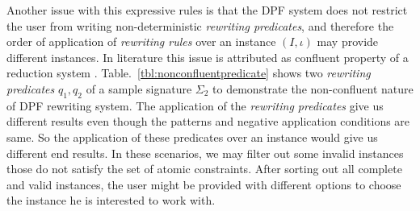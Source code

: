 \documentclass{eceasst}
\begin{document}
Another issue with this expressive rules is that the DPF system does not restrict the user from writing non-deterministic \textit{rewriting predicates}, and therefore  
the order of application of \textit{rewriting rules} over an instance $(I, \iota)$ may provide different instances. 
In literature this issue is attributed as confluent property of a reduction system \cite{BN98}. 
Table.~\ref{tbl:nonconfluentpredicate} shows two \textit{rewriting predicates} $q_1, q_2$ of a sample signature $\Sigma_2$ to demonstrate the non-confluent nature of DPF rewriting system. 
The application of the \textit{rewriting predicates} give us different results even though the patterns and negative application conditions are same. So the application of these predicates 
over an instance would give us different end results. In these scenarios, we may filter out some invalid instances those do not satisfy the set of atomic constraints. 
After sorting out all complete and valid instances, the user might be provided with different options to choose the instance he is interested to work with. 
\end{document}

